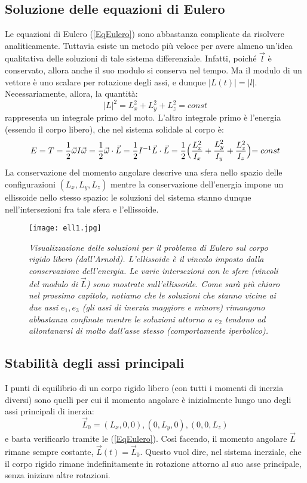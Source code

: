 \documentclass[a4paper,openany]{article}
\begin{document}
	\subsection{Soluzione delle equazioni di Eulero}
	Le equazioni di Eulero (\ref{EqEulero}) sono abbastanza complicate da risolvere analiticamente. Tuttavia esiste un metodo più veloce per avere almeno un'idea qualitativa delle soluzioni di tale sistema differenziale. Infatti, poiché $\vec{l}$ è conservato, allora anche il suo modulo si conserva nel tempo. Ma il modulo di un vettore è uno scalare per rotazione degli assi, e dunque $|L(t)| = |l|$. Necessariamente, allora, la quantità:
	$$
	|L|^{2} = L_x^2 + L_y^2 +L_z^2 = const
	$$
	rappresenta un integrale primo del moto. L'altro integrale primo è l'energia (essendo il corpo libero), che nel sistema solidale al corpo è:
	$$
	E = T = \dfrac{1}{2}\vec{\omega}I\vec{\omega} = \dfrac{1}{2}\vec{\omega}\cdot\vec{L} = \dfrac{1}{2}I^{-1}\vec{L}\cdot\vec{L} =  \dfrac{1}{2}\Bigl(\dfrac{L_x^2}{I_x} +\dfrac{L_y^2}{I_y}+\dfrac{L_z^2}{I_z}\Bigl) = const
	$$
	La conservazione del momento angolare descrive una sfera nello spazio delle configurazioni $(L_x,L_y,L_z)$ mentre la conservazione dell'energia impone un ellissoide nello stesso spazio: le soluzioni del sistema stanno dunque nell'intersezioni fra tale sfera e l'ellissoide.
\begin{figure}[H]
	\centering
	\texttt{[image: ell1.jpg]}
	\caption{\textit{Visualizzazione delle soluzioni per il problema di Eulero sul corpo rigido libero (dall'Arnold). L'ellissoide è il vincolo imposto dalla conservazione dell'energia. Le varie intersezioni con le sfere (vincoli del modulo di $\vec{L}$) sono mostrate sull'ellissoide. Come sarà più chiaro nel prossimo capitolo, notiamo che le soluzioni che stanno vicine ai due assi $e_1, e_3$ (gli assi di inerzia maggiore e minore) rimangono abbastanza confinate mentre le soluzioni attorno a $e_2$ tendono ad allontanarsi di molto dall'asse stesso (comportamente iperbolico).}}
\end{figure}
	\subsection{Stabilità degli assi principali}
	I punti di equilibrio di un corpo rigido libero (con tutti i momenti di inerzia diversi) sono quelli per cui il momento angolare è inizialmente lungo uno degli assi principali di inerzia:
	$$
	\vec{L}_0 = (L_x,0,0), (0,L_y,0), (0,0,L_z)
	$$
	e basta verificarlo tramite le (\ref{EqEulero}). Così facendo, il momento angolare $\vec{L}$ rimane sempre costante, $\vec{L}(t) = \vec{L}_0$. Questo vuol dire, nel sistema inerziale, che il corpo rigido rimane indefinitamente in rotazione attorno al suo asse principale, senza iniziare altre rotazioni.
	
\end{document}
